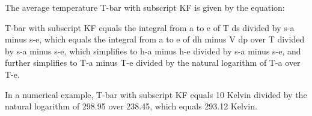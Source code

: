 The average temperature T-bar with subscript KF is given by the equation:

T-bar with subscript KF equals the integral from a to e of T ds divided by s-a minus s-e, which equals the integral from a to e of dh minus V dp over T divided by s-a minus s-e, which simplifies to h-a minus h-e divided by s-a minus s-e, and further simplifies to T-a minus T-e divided by the natural logarithm of T-a over T-e.

In a numerical example, T-bar with subscript KF equals 10 Kelvin divided by the natural logarithm of 298.95 over 238.45, which equals 293.12 Kelvin.